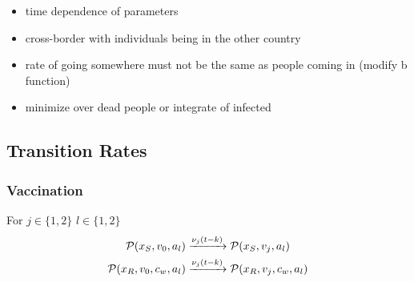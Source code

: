 \begin{itemize}
\item time dependence of parameters
\item cross-border with individuals being in the other country
\item rate of going somewhere must not be the same as people coming in (modify b function)
\item minimize over dead people or integrate of infected
\end{itemize}

\subsection{Transition Rates}

\subsubsection*{Vaccination}
For $j \in \{1,2\}$ $l \in \{1,2\}$
\begin{align*}
\mathcal{P}(x_S, v_0, a_l) &\xrightarrow{\nu_j(t-k)} \mathcal{P}(x_S, v_j, a_l) \notag \\
\mathcal{P}(x_R, v_0, c_w, a_l) &\xrightarrow{\nu_j(t-k)} \mathcal{P}(x_R, v_j, c_w, a_l)
\end{align*}

